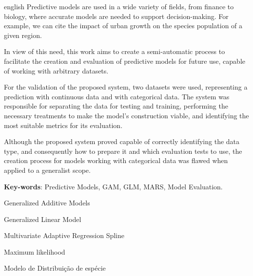 \documentclass[
    12pt,               %
    openright,          %
    oneside,            %
    a4paper,            %
    english,            %
    brazil              %
    ]{abntex2}
\begin{document}
\begin{resumo}[Abstract]
 \begin{otherlanguage*}{english}
    Predictive models are used in a wide variety of fields, from finance to biology, 
    where accurate models are needed to support decision-making. For example, we can 
    cite the impact of urban growth on the species population of a given region.

    In view of this need, this work aims to create a semi-automatic process to 
    facilitate the creation and evaluation of predictive models for future use, 
    capable of working with arbitrary datasets.

    For the validation of the proposed system, two datasets were used, representing a 
    prediction with continuous data and with categorical data. The system was responsible 
    for separating the data for testing and training, performing the necessary treatments to make the model's construction viable, 
    and identifying the most suitable metrics for its evaluation.

    Although the proposed system proved capable of correctly identifying the data type, and consequently how to prepare it and which evaluation tests to use, the creation process for models working with categorical data was flawed when applied to a generalist scope.
   
   \textbf{Key-words}: Predictive Models, GAM, GLM, MARS, Model Evaluation.
 \end{otherlanguage*}
\end{resumo}

\listoffigures*
\cleardoublepage

\listoftables*
\cleardoublepage

\begin{siglas}
  \item[GAM] Generalized Additive Models
  \item[GLM] Generalized Linear Model
  \item[MARS] Multivariate Adaptive Regression Spline
  \item[ML] Maximum likelihood
  \item[SDM] Modelo de Distribuição de espécie
\end{siglas}
\end{document}
